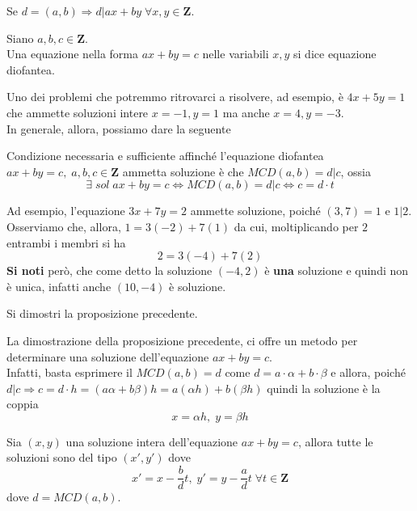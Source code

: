 \begin{flushleft}
\begin{cons}
Se $d = (a, b) \Rightarrow d|ax + by\; \forall x, y \in \mathbf{Z}$.
\end{cons}
\begin{definizione}
Siano $a,b, c \in \mathbf{Z}.$\\
Una equazione nella forma $ax + by = c$ nelle variabili $x, y$ si dice equazione diofantea.
\end{definizione}
Uno dei problemi che potremmo ritrovarci a risolvere, ad esempio, è $4x + 5y = 1$ che ammette soluzioni intere $x = -1, y = 1$ ma anche $x=4, y = -3$.\\
In generale, allora, possiamo dare la seguente
\begin{proposizione}
Condizione necessaria e sufficiente affinché l'equazione diofantea $ax + by = c,\;a,b,c \in \mathbf{Z}$ ammetta soluzione è che $MCD(a, b) = d|c$, ossia
\[\exists\;sol\;ax + by = c \Leftrightarrow MCD(a, b) = d|c \Leftrightarrow c = d\cdot t\]
\end{proposizione}
\begin{esempio}
\end{esempio}
Ad esempio, l'equazione $3x + 7y = 2$ ammette soluzione, poiché $(3, 7) = 1$ e $1|2$.\\
Osserviamo che, allora, $1 = 3(-2) + 7(1)$ da cui, moltiplicando per $2$ entrambi i membri si ha
\[2 = 3(-4) + 7(2)\]
\textbf{Si noti} però, che come detto la soluzione $(-4, 2)$ è \textbf{una} soluzione e quindi non è unica, infatti anche $(10, -4)$ è soluzione.
\begin{esercizio}
Si dimostri la proposizione precedente.
\end{esercizio}
\vspace{200px}

\begin{osservazione}
La dimostrazione della proposizione precedente, ci offre un metodo per determinare una soluzione dell'equazione $ax + by = c$.\\
Infatti, basta esprimere il $MCD(a, b) = d$ come $d = a\cdot \alpha + b \cdot \beta$ e allora, poiché $d|c\Rightarrow c = d\cdot h = (a\alpha + b \beta) h= a(\alpha h) + b(\beta h)$ quindi la soluzione è la coppia
\[x = \alpha h,\;y = \beta h\]
\end{osservazione}

\begin{proposizione}
Sia $(x, y)$ una soluzione intera dell'equazione $ax + by = c$, allora tutte le soluzioni sono del tipo $(x', y')$ dove
\[x' = x - \frac{b}{d}t,\;y' = y - \frac{a}{d}t\;\forall t \in \mathbf{Z}\]
dove $d = MCD(a, b)$.
\end{proposizione}


\end{flushleft}
